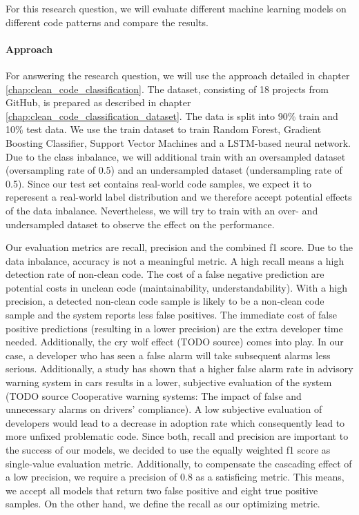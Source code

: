 For this research question, we will evaluate different machine learning models on different code patterns and compare the results.

\paragraph{Approach}
For answering the research question, we will use the approach detailed in chapter \ref{chap:clean_code_classification}.  The dataset, consisting of 18 projects from GitHub, is prepared as described in chapter \ref{chap:clean_code_classification_dataset}. The data is split into 90\% train and 10\% test data. We use the train dataset to train Random Forest, Gradient Boosting Classifier, Support Vector Machines and a LSTM-based neural network. Due to the class inbalance, we will additional train with an oversampled dataset (oversampling rate of 0.5) and an undersampled dataset (undersampling rate of 0.5). Since our test set contains real-world code samples, we expect it to reperesent a real-world label distribution and we therefore accept potential effects of the data inbalance. Nevertheless, we will try to train with an over- and undersampled dataset to observe the effect on the performance.

Our evaluation metrics are recall, precision and the combined f1 score. Due to the data inbalance, accuracy is not a meaningful metric. A high recall means a high detection rate of non-clean code. The cost of a false negative prediction are potential costs in unclean code (maintainability, understandability). With a high precision, a detected non-clean code sample is likely to be a non-clean code sample and the system reports less false positives. The immediate cost of false positive predictions (resulting in a lower precision) are the extra developer time needed. Additionally, the cry wolf effect (TODO source) comes into play. In our case, a developer who has seen a false alarm will take subsequent alarms less serious. Additionally, a study has shown that a higher false alarm rate in advisory warning system in cars results in a lower, subjective evaluation of the system (TODO source Cooperative warning systems: The impact of false and unnecessary alarms on drivers’ compliance). A low subjective evaluation of developers would lead to a decrease in adoption rate which consequently lead to more unfixed problematic code. Since both, recall and precision are important to the success of our models, we decided to use the equally weighted f1 score as single-value evaluation metric.
Additionally, to compensate the cascading effect of a low precision, we require a precision of 0.8 as a satisficing metric. This means, we accept all models that return two false positive and eight true positive samples. On the other hand, we define the recall as our optimizing metric.

